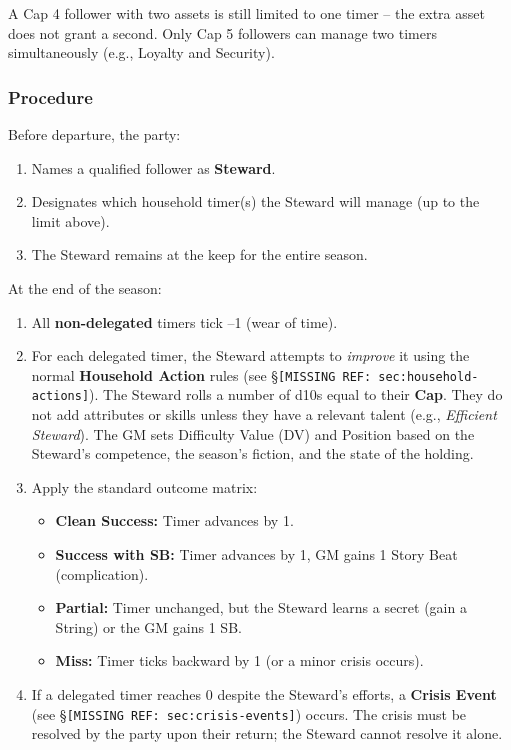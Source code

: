 \documentclass[11pt]{article}
\begin{document}
\noindent
A Cap 4 follower with two assets is still limited to one timer -- the extra asset does not grant a second. Only Cap 5 followers can manage two timers simultaneously (e.g., Loyalty and Security).

\subsubsection*{Procedure}
Before departure, the party:
\begin{enumerate}
    \item Names a qualified follower as \textbf{Steward}.
    \item Designates which household timer(s) the Steward will manage (up to the limit above).
    \item The Steward remains at the keep for the entire season.
\end{enumerate}

At the end of the season:
\begin{enumerate}
    \item All \textbf{non-delegated} timers tick --1 (wear of time).
    \item For each delegated timer, the Steward attempts to \textit{improve} it using the normal \textbf{Household Action} rules (see §\texttt{[MISSING REF: sec:household-actions]}). The Steward rolls a number of d10s equal to their \textbf{Cap}. They do not add attributes or skills unless they have a relevant talent (e.g., \textit{Efficient Steward}). The GM sets Difficulty Value (DV) and Position based on the Steward's competence, the season's fiction, and the state of the holding.
    \item Apply the standard outcome matrix:
    \begin{itemize}
        \item \textbf{Clean Success:} Timer advances by 1.
        \item \textbf{Success with SB:} Timer advances by 1, GM gains 1 Story Beat (complication).
        \item \textbf{Partial:} Timer unchanged, but the Steward learns a secret (gain a String) or the GM gains 1 SB.
        \item \textbf{Miss:} Timer ticks backward by 1 (or a minor crisis occurs).
    \end{itemize}
    \item If a delegated timer reaches 0 despite the Steward's efforts, a \textbf{Crisis Event} (see §\texttt{[MISSING REF: sec:crisis-events]}) occurs. The crisis must be resolved by the party upon their return; the Steward cannot resolve it alone.
\end{enumerate}
\end{document}
